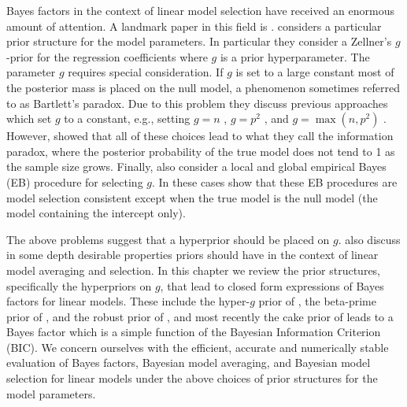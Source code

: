 Bayes factors in the context of linear model selection 
\citep{Zellner1980,
	Zellner1980b,
	Mitchell1988,
	George1993,
	Fernandez2001,
	Liang2008,
	Maruyama2011,
	Bayarri2012}
have received an 
enormous amount of attention. A landmark paper in this field is \cite{Liang2008}.
\cite{Liang2008} considers a particular prior structure for the model parameters. 
In particular they consider a Zellner's $g$-prior \citep{Zellner1980,Zellner1986} 
for the regression coefficients where $g$ is a prior hyperparameter. The parameter $g$
requires special consideration. If $g$ is set to a large constant most of the posterior
mass is placed on the null model, a phenomenon sometimes referred to as Bartlett's paradox.
Due to this problem they discuss previous approaches which set $g$ to a constant, e.g., setting $g=n$ \citep{Kass1995b},  $g=p^2$ \citep{Foster1994},
and $g=\max(n,p^2)$ \citep{Fernandez2001}. However, \cite{Liang2008} showed that 
all of these choices
lead to what they call the information paradox, where the posterior probability of the
true model does not tend to 1 as the sample size grows. Finally, \cite{Liang2008} also consider
a local and global empirical Bayes (EB) procedure for selecting $g$. In these cases \cite{Liang2008}
show that these EB procedures are model selection consistent except when the true model is the null
model (the model containing the intercept only). 

The above problems suggest that a hyperprior should
be placed on $g$. \cite{Bayarri2012} also discuss in some depth desirable properties
priors should have in the context of linear model averaging and selection. 
In this chapter we review the prior structures, specifically the hyperpriors on $g$, 
that lead to closed form expressions of Bayes factors for linear models.
These include the hyper-$g$ prior of \cite{Liang2008}, the beta-prime prior of \cite{Maruyama2011}, and the robust 
prior of \cite{Bayarri2012}, and most recently the cake prior of \cite{OrmerodEtal2017} leads to a Bayes factor which is a simple function of the Bayesian Information Criterion (BIC). We concern ourselves with the efficient, accurate and numerically stable evaluation of Bayes factors, Bayesian model averaging,
and Bayesian model selection  for linear models 
under the above choices of prior structures for the model parameters.


